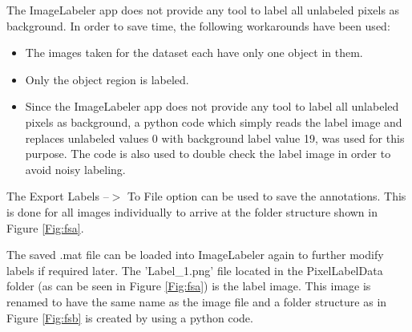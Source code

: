 The ImageLabeler app does not provide any tool to label all unlabeled pixels as background. In order to save time, the following workarounds have been used:
	\begin{itemize}
		\item The images taken for the dataset each have only one object in them.
		\item Only the object region is labeled.
		\item Since the ImageLabeler app does not provide any tool to label all unlabeled pixels as background, a python code which simply reads the label image and replaces unlabeled values 0 with background label value 19, was used for this purpose. The code is also used to double check the label image in order to avoid noisy labeling.
	\end{itemize}
	
The Export Labels --$>$ To File option can be used to save the annotations. This is done for all images individually to arrive at the folder structure shown in Figure \ref{Fig:fsa}.
	
The saved .mat file can be loaded into ImageLabeler again to further modify labels if required later. The 'Label\_1.png' file located in the PixelLabelData folder (as can be seen in Figure  \ref{Fig:fsa}) is the label image. This image is renamed to have the same name as the image file and a folder structure as in Figure  \ref{Fig:fsb} is created by using a python code.
	
